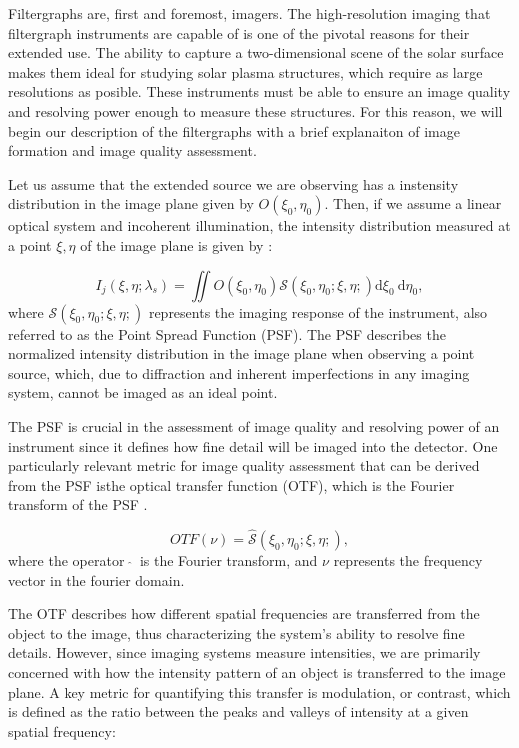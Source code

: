 Filtergraphs are, first and foremost, imagers. The high-resolution imaging that filtergraph instruments are capable of is one of the pivotal reasons for their extended use. The ability to capture a two-dimensional scene of the solar surface makes them ideal for studying solar plasma structures, which require as large resolutions as posible. These instruments must be able to ensure an image quality and resolving power enough to measure these structures. For this reason, we will begin our description of the filtergraphs with a brief explanaiton of image formation and image quality assessment. 

Let us assume that the extended source we are observing has a instensity distribution in the image plane given by $O(\xi _ 0, \eta _ 0)$. Then, if we assume a linear optical system and incoherent illumination, the intensity distribution measured at a point $\xi, \eta$ of the image plane is given by : 

\begin{equation}
  I_ j\left(\xi, \eta ; \lambda_{s}\right)= \iint  O\left(\xi_0, \eta_0\right)  \mathcal{S}\left(\xi_0, \eta_0; \xi , \eta;\right)  \mathrm{d} \xi_{0} \mathrm{~d} \eta_{0},
  \label{eq_imaging: intensity_simple}
\end{equation}
where $\mathcal{S}\left(\xi_0, \eta_0; \xi , \eta;\right)$ represents the imaging response of the instrument, also referred to as the Point Spread Function (PSF). The PSF describes the normalized intensity distribution in the image plane when observing a point source, which, due to diffraction and inherent imperfections in any imaging system, cannot be imaged as an ideal point.

The PSF is crucial in the assessment of image quality and resolving power of an instrument since it defines how fine detail will be imaged into the detector. One particularly relevant metric for image quality assessment that can be derived from the PSF isthe optical transfer function (OTF), which is the Fourier transform of the PSF \citep{vargas_tesis}. 

\begin{equation}
  OTF(\nu) = \hat{\mathcal{S}}\left(\xi_0, \eta_0; \xi , \eta;\right),
\end{equation}
where the operator  $\ \hat{ }\ $  is the Fourier transform, and $\nu$ represents the frequency vector in the fourier domain.

The OTF describes how different spatial frequencies are transferred from the object to the image, thus characterizing the system's ability to resolve fine details. However, since imaging systems measure intensities, we are primarily concerned with how the intensity pattern of an object is transferred to the image plane. A key metric for quantifying this transfer is modulation, or contrast, which is defined as the ratio between the peaks and valleys of intensity at a given spatial frequency:

